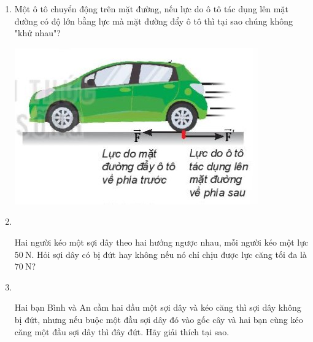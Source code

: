 \begin{enumerate}[label=\bfseries Bài \arabic*:,leftmargin=1.5cm]
\item {}

{
	
	Một ô tô chuyển động trên mặt đường, nếu lực do ô tô tác dụng lên mặt đường có độ lớn bằng lực mà mặt đường đẩy ô tô thì tại sao chúng không "khử nhau"?
	\begin{center}
		\includegraphics[scale=0.6]{../figs/VN10-2022-PH-TP017-4.jpg}
	\end{center}
}




	\item {}\\
	{Hai người kéo một sợi dây theo hai hướng ngược nhau, mỗi người kéo một lực $\SI{50}{\newton}$. Hỏi sợi dây có bị đứt hay không nếu nó chỉ chịu được lực căng tối đa là $\SI{70}{\newton}$?
	
}

\item{}\\
{Hai bạn Bình và An cầm hai đầu một sợi dây và kéo căng thì sợi dây không bị đứt, nhưng nếu buộc một đầu sợi dây đó vào gốc cây và hai bạn cùng kéo căng một đầu sợi dây thì đây đứt. Hãy giải thích tại sao.

}
\end{enumerate}

